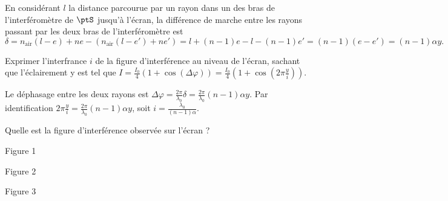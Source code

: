 \begin{corrige}
	En considérant $l$ la distance parcourue par un rayon dans un des bras de l'interféromètre de $\ptS$ jusqu'à l'écran, la différence de marche entre les rayons passant par les deux bras de l'interféromètre est
	$$
	\delta = n_{\text{air}}\left( l - e \right) + ne - \left( n_{\text{air}}\left( l - e' \right) + ne' \right) = l + \left( n - 1 \right)e -  l - \left( n - 1 \right)e'  = \left( n - 1 \right)\left( e - e' \right)  = \left( n - 1 \right)\alpha y.
	$$
\end{corrige}




\begin{enonce}
Exprimer l'interfrance $i$ de la figure d'interférence au niveau de l'écran, sachant que l'éclairement y est tel que $I = \frac{I_0}{4}\left( 1 + \cos\left(  \Delta \varphi \right) \right) = \frac{I_0}{4}\left( 1 + \cos\left(  2\pi\frac{y}{i} \right) \right)$.
\end{enonce}


\begin{corrige}
Le déphasage entre les deux rayons est $
\Delta \varphi = \frac{2\pi}{\lambda_0}\delta = \frac{2\pi}{\lambda_0}\left( n - 1 \right)\alpha y
$.
Par identification $2\pi\frac{y}{i} = \frac{2\pi}{\lambda_0}\left( n - 1 \right)\alpha y$, soit $i = \frac{\lambda_0}{\left( n-1 \right)\alpha}$.
\end{corrige}




\begin{enonce}
	Quelle est la figure d'interférence observée sur l'écran ?
	\begin{listeQCM3Colonnes}
		\item Figure 1
		\item Figure 2
		\item Figure 3
		\end{listeQCM3Colonnes}
\end{enonce}
	
	
